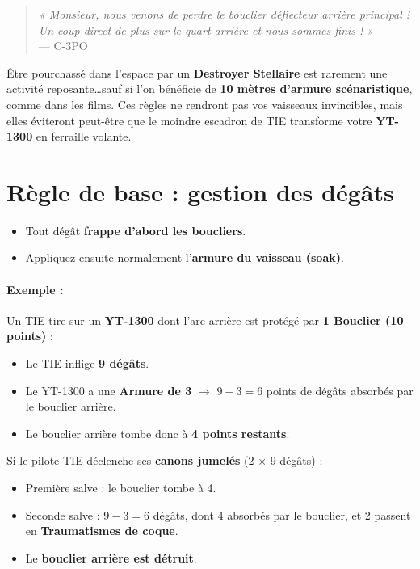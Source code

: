 \documentclass{article}
\begin{document}
\begin{quote}
\textit{« Monsieur, nous venons de perdre le bouclier déflecteur arrière principal ! 
Un coup direct de plus sur le quart arrière et nous sommes finis ! »} \\
--- C-3PO
\end{quote}

Être pourchassé dans l’espace par un \textbf{Destroyer Stellaire} est rarement une activité reposante\dots sauf si l’on bénéficie de \textbf{10 mètres d’armure scénaristique}, comme dans les films. Ces règles ne rendront pas vos vaisseaux invincibles, mais elles éviteront peut-être que le moindre escadron de TIE  transforme votre \textbf{YT-1300} en ferraille volante.

\section*{Règle de base : gestion des dégâts}
\begin{itemize}
  \item Tout dégât \textbf{frappe d’abord les boucliers}.
  \item Appliquez ensuite normalement l’\textbf{armure du vaisseau (soak)}.
\end{itemize}

\paragraph{Exemple :}
Un TIE tire sur un \textbf{YT-1300} dont l’arc arrière est protégé par \textbf{1 Bouclier (10 points)} :
\begin{itemize}
  \item Le TIE inflige \textbf{9 dégâts}.
  \item Le YT-1300 a une \textbf{Armure de 3} $\rightarrow$ $9 - 3 = 6$ points de dégâts absorbés par le bouclier arrière.
  \item Le bouclier arrière tombe donc à \textbf{4 points restants}.
\end{itemize}

Si le pilote TIE déclenche ses \textbf{canons jumelés} (2 × 9 dégâts) :
\begin{itemize}
  \item Première salve : le bouclier tombe à 4.
  \item Seconde salve : $9 - 3 = 6$ dégâts, dont 4 absorbés par le bouclier, et 2 passent en \textbf{Traumatismes de coque}.
  \item Le \textbf{bouclier arrière est détruit}.
\end{itemize}
\end{document}
